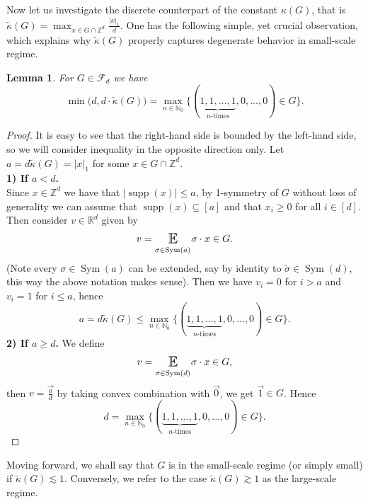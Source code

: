 \documentclass[10pt,a4paper]{amsart}
\numberwithin{equation}{section}
\newtheorem{Lem}[Thm]{Lemma}
\newcommand{\E}{\mathop{\mathbb{E}}}
\newcommand{\Z}{\mathbb{Z}}
\newcommand{\R}{\mathbb{R}}
\newcommand{\N}{\mathbb{N}}
\DeclareMathOperator{\Sym}{Sym}
\DeclareMathOperator{\supp}{supp}
\newcommand{\se}[1]{\underset{_{\substack{#1}}}{\mathlarger{\mathlarger{\E}}}}
\begin{document}
Now let us investigate the discrete counterpart of the constant $\kappa(G)$, that is $\widetilde{\kappa}(G)=\max_{x \in G \cap \Z^d} \frac{|x|_1}{d}$. One has the following simple, yet crucial observation, which explains why $\widetilde{\kappa}(G)$ properly captures degenerate behavior in small-scale regime.
\begin{Lem} \label{kappa tilde property}
    For $G \in \mathcal{F}_d$ we have
    \[
    \min\Big(d,d \cdot\widetilde{\kappa}(G) \Big)= \max_{n \in \N_0} \Big\{ (\underbrace{1,1,\ldots,1}_{n\text{-times}},0,...,0) \in G \Big\}.
    \]
\end{Lem}
\begin{proof}
    It is easy to see that the right-hand side is bounded by the left-hand side, so we will consider inequality in the opposite direction only. Let $a=d \widetilde{\kappa}(G)= |x|_1$ for some $x \in G \cap \Z^d$. \\
    \textbf{1) If $a<d$.} \\
    Since $x \in \Z^d$ we have that $| \supp(x)| \le a$, by 1-symmetry of $G$ without loss of generality we can assume that $\supp(x) \subseteq [a]$ and that $x_i \ge 0$ for all $i \in [d]$. Then consider $v \in \R^d$ given by 
    \[
    v= \se{\sigma \in \Sym(a)} \sigma \cdot x \in G.
    \]
    (Note every $\sigma \in \Sym(a)$ can be extended, say by identity to $\widetilde{\sigma} \in \Sym(d)$, this way the above notation makes sense).
    Then we have $v_i=0$ for $i>a$ and $v_i=1$ for $i \le a$, hence
    \[
    a=d\widetilde{\kappa}(G) \le  \max_{n \in \N_0} \Big\{ (\underbrace{1,1,\ldots,1}_{n\text{-times}},0,...,0) \in G \Big\}.
    \]
    \textbf{2) If $a \ge d$.}
    We define 
    \[
    v=\se{\sigma \in \Sym(d)} \sigma \cdot x \in G,
    \]
    then $v= \overrightarrow{\frac{a}{d}}$ by taking convex combination with $\overrightarrow{0}$, we get $\overrightarrow{1} \in G$.
    Hence
    \[
    d=\max_{n \in \N_0} \Big\{ (\underbrace{1,1,\ldots,1}_{n\text{-times}},0,...,0) \in G \Big\}.
    \]
\end{proof}
Moving forward, we shall say that $G$ is in the small-scale regime (or simply small) if $\widetilde{\kappa}(G) \lesssim 1$. Conversely, we refer to the case $\widetilde{\kappa}(G) \gtrsim 1$ as the large-scale regime. 
\end{document}

